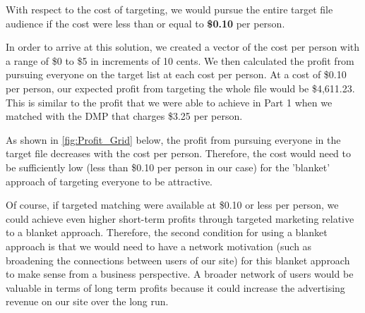 With respect to the cost of targeting, we would pursue the entire target file audience if the cost were less than or equal to \textbf{\$0.10} per person.

In order to arrive at this solution, we created a vector of the cost per person with a range of \$0 to \$5 in increments of 10 cents. We then calculated the profit from pursuing everyone on the target list at each cost per person. At a cost of \$0.10 per person, our expected profit from targeting the whole file would be \$4,611.23. This is similar to the profit that we were able to achieve in Part 1 when we matched with the DMP that charges \$3.25 per person.

As shown in \cref{fig:Profit_Grid} below, the profit from pursuing everyone in the target file decreases with the cost per person. Therefore, the cost would need to be sufficiently low (less than \$0.10 per person in our case) for the 'blanket' approach of targeting everyone to be attractive. 

Of course, if targeted matching were available at \$0.10 or less per person, we could achieve even higher short-term profits through targeted marketing relative to a blanket approach. Therefore, the second condition for using a blanket approach is that we would need to have a network motivation (such as broadening the connections between users of our site) for this blanket approach to make sense from a business perspective. A broader network of users would be valuable in terms of long term profits because it could increase the advertising revenue on our site over the long run.

